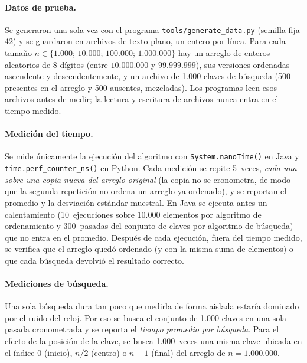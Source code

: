 \documentclass[11pt,a4paper]{article}
\newcommand{\code}[1]{\texttt{#1}}
\begin{document}
\paragraph{Datos de prueba.} Se generaron una sola vez con el programa \code{tools/generate\_data.py} (semilla
fija 42) y se guardaron en archivos de texto plano, un entero por l\'inea. Para cada tama\~no
$n\in\{1.000;\,10.000;\,100.000;\,1.000.000\}$ hay un arreglo de enteros aleatorios de 8 d\'igitos (entre
$10.000.000$ y $99.999.999$), sus versiones ordenadas ascendente y descendentemente, y un archivo de 1.000
claves de b\'usqueda (500 presentes en el arreglo y 500 ausentes, mezcladas). Los programas leen esos
archivos antes de medir; la lectura y escritura de archivos nunca entra en el tiempo medido.

\paragraph{Medici\'on del tiempo.} Se mide \'unicamente la ejecuci\'on del algoritmo con
\code{System.nanoTime()} en Java y \code{time.perf\_counter\_ns()} en Python. Cada medici\'on se repite
5~veces, \emph{cada una sobre una copia nueva del arreglo original} (la copia no se cronometra, de modo que
la segunda repetici\'on no ordena un arreglo ya ordenado), y se reportan el promedio y la desviaci\'on
est\'andar muestral. En Java se ejecuta antes un calentamiento (10~ejecuciones sobre 10.000 elementos por
algoritmo de ordenamiento y 300~pasadas del conjunto de claves por algoritmo de b\'usqueda) que no entra en el
promedio. Despu\'es de cada ejecuci\'on, fuera del tiempo medido, se verifica que el arreglo qued\'o ordenado
(y con la misma suma de elementos) o que cada b\'usqueda devolvi\'o el resultado correcto.

\paragraph{Mediciones de b\'usqueda.} Una sola b\'usqueda dura tan poco que medirla de forma aislada estar\'ia
dominado por el ruido del reloj. Por eso se busca el conjunto de 1.000 claves en una sola pasada cronometrada y
se reporta el \emph{tiempo promedio por b\'usqueda}. Para el efecto de la posici\'on de la clave, se busca
1.000~veces una misma clave ubicada en el \'indice $0$ (inicio), $n/2$ (centro) o $n-1$ (final) del arreglo de
$n=1.000.000$.
\end{document}
